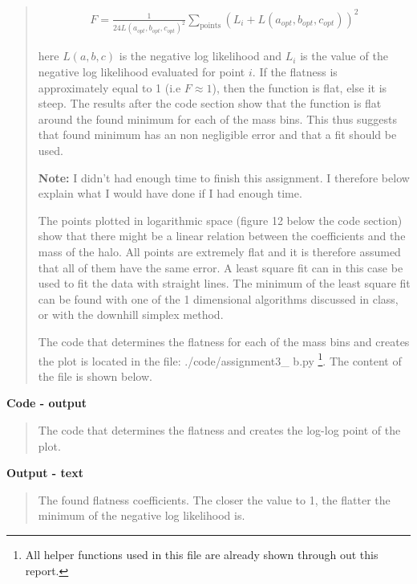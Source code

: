 \begin{quote}
\begin{align}
F =  \frac{1}{24 L(a_{opt}, b_{opt}, c_{opt})^2} \sum_{\text{points}} \left( L_i + L(a_{opt}, b_{opt}, c_{opt}) \right)^2
\end{align}

here $L(a,b,c)$ is the negative log likelihood and $L_i$ is the value of the negative log likelihood evaluated for point $i$. If the flatness is approximately equal to 1 (i.e $F \approx 1$), then the function is flat, else it is steep. The results after the code section show that the function is flat around the found minimum for each of the mass bins. This thus suggests that found minimum has an non negligible error and that a fit should be used.

\textbf{Note:} I didn't had enough time to finish this assignment. I therefore below explain what I would have done if I had enough time.

The points plotted in logarithmic space (figure 12 below the code section) show that there might be a linear relation between the coefficients and the mass of the halo. All points are extremely flat and it is therefore assumed that all of them have the same error. A least square fit can in this case be used to fit the data with straight lines. The minimum of the least square fit can be found with one of the 1 dimensional algorithms discussed in class, or with the downhill simplex method.


The code that determines the flatness for each of the mass bins and creates the plot is located in the file: \textsf{./code/assignment3\_ b.py} \footnote{All helper functions used in this file are already shown through out this report.}. The content of the file is shown below. 
\end{quote}

\newpage

\textbf{Code - output}
\begin{quote}
The code that determines the flatness and creates the log-log point of the plot.

\end{quote}


\textbf{Output - text}
\begin{quote}
The found flatness coefficients. The closer the value to 1, the flatter the minimum of the negative log likelihood is.

\end{quote}

